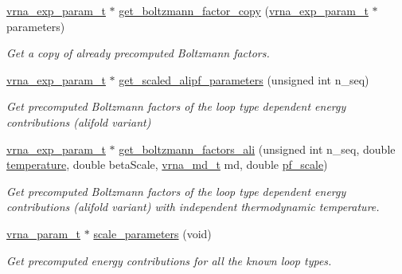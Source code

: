 \begin{DoxyCompactItemize}
\mbox{\hyperlink{group__energy__parameters_ga01d8b92fe734df8d79a6169482c7d8d8}{vrna\+\_\+exp\+\_\+param\+\_\+t}} $\ast$ \mbox{\hyperlink{group__energy__parameters_ga665a446ba8ff211e551297a8fa36ec27}{get\+\_\+boltzmann\+\_\+factor\+\_\+copy}} (\mbox{\hyperlink{group__energy__parameters_ga01d8b92fe734df8d79a6169482c7d8d8}{vrna\+\_\+exp\+\_\+param\+\_\+t}} $\ast$parameters)
\begin{DoxyCompactList}\small\item\em Get a copy of already precomputed Boltzmann factors. \end{DoxyCompactList}\item 
\mbox{\hyperlink{group__energy__parameters_ga01d8b92fe734df8d79a6169482c7d8d8}{vrna\+\_\+exp\+\_\+param\+\_\+t}} $\ast$ \mbox{\hyperlink{group__energy__parameters_ga0ccf4e1be085a573533fd6b9da2d8cf9}{get\+\_\+scaled\+\_\+alipf\+\_\+parameters}} (unsigned int n\+\_\+seq)
\begin{DoxyCompactList}\small\item\em Get precomputed Boltzmann factors of the loop type dependent energy contributions (alifold variant) \end{DoxyCompactList}\item 
\mbox{\hyperlink{group__energy__parameters_ga01d8b92fe734df8d79a6169482c7d8d8}{vrna\+\_\+exp\+\_\+param\+\_\+t}} $\ast$ \mbox{\hyperlink{group__energy__parameters_ga2aa1d87c97f35d2e4121634a17556829}{get\+\_\+boltzmann\+\_\+factors\+\_\+ali}} (unsigned int n\+\_\+seq, double \mbox{\hyperlink{group__model__details_gab4b11c8d9c758430960896bc3fe82ead}{temperature}}, double beta\+Scale, \mbox{\hyperlink{group__model__details_ga1f8a10e12a0a1915f2a4eff0b28ea17c}{vrna\+\_\+md\+\_\+t}} md, double \mbox{\hyperlink{group__model__details_gad3b22044065acc6dee0af68931b52cfd}{pf\+\_\+scale}})
\begin{DoxyCompactList}\small\item\em Get precomputed Boltzmann factors of the loop type dependent energy contributions (alifold variant) with independent thermodynamic temperature. \end{DoxyCompactList}\item 
\mbox{\hyperlink{group__energy__parameters_ga8a69ca7d787e4fd6079914f5343a1f35}{vrna\+\_\+param\+\_\+t}} $\ast$ \mbox{\hyperlink{group__energy__parameters_ga541f2cf7436e9bc939b0a49b24baf987}{scale\+\_\+parameters}} (void)
\begin{DoxyCompactList}\small\item\em Get precomputed energy contributions for all the known loop types. \end{DoxyCompactList}\item 

\end{DoxyCompactItemize}
